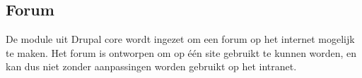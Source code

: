 \subsection{Forum}\label{forum}

De  module uit Drupal core wordt ingezet om een forum op het internet mogelijk te maken. Het forum is ontworpen om op \'{e}\'{e}n site gebruikt te kunnen worden, en kan dus niet zonder aanpassingen worden gebruikt op het intranet.

